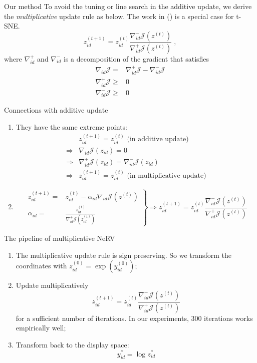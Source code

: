 \documentclass[first=dgreen,second=purple,logo=yellowexc]{aaltoslides}
\begin{document}
\begin{frame}{Our method}
To avoid the tuning or line search in the additive update, we derive the \emph{multiplicative} update rule as below. The work in (\cite{yang10mlsp}) is a special case for t-SNE.
\[
z^{(t+1)}_{id}=z^{(t)}_{id}\frac{\nabla^-_{id} \mathcal{J}(z^{(t)})}{\nabla^+_{id} \mathcal{J}(z^{(t)})}\;,
\]
where $\nabla_{id}^+$ and $\nabla_{id}^-$ is a decomposition of the gradient that satisfies
\begin{align*}
\nabla_{id}\mathcal{J} =& \nabla_{id}^+\mathcal{J}-\nabla_{id}^-\mathcal{J}\\
\nabla_{id}^+\mathcal{J} \ge& 0\\
\nabla_{id}^-\mathcal{J} \ge& 0
\end{align*}
\end{frame}

\begin{frame}{Connections with additive update}
\begin{enumerate}
\item They have the same extreme points:
\begin{align*}
& z_{id}^{(t+1)}=z_{id}^{(t)} \mbox{ (in additive update)}\\
\Longrightarrow& \nabla_{id}\mathcal{J}(z_{id})=0\\
\Longrightarrow& \nabla_{id}^+\mathcal{J}(z_{id})=\nabla_{id}^-\mathcal{J}(z_{id})\\
\Longrightarrow& z_{id}^{(t+1)}=z_{id}^{(t)}\mbox{ (in multiplicative update)}
\end{align*}
\item
\[
\left.
\begin{aligned}
z^{(t+1)}_{id} =& z^{(t)}_{id}-\alpha_{id} \nabla_{id} \mathcal{J}(z^{(t)})\\
\alpha_{id} =& \frac{z_{id}^{(t)}}{\nabla_{id}^+\mathcal{J}(z_{id}^{(t)})}
\end{aligned}
\right\}\Longrightarrow z^{(t+1)}_{id}=z^{(t)}_{id}\frac{\nabla^-_{id} \mathcal{J}(z^{(t)})}{\nabla^+_{id} \mathcal{J}(z^{(t)})}
\]
\end{enumerate}
\end{frame}


\begin{frame}{The pipeline of multiplicative NeRV}
\begin{enumerate}
\item The multiplicative update rule is sign preserving. So we transform the coordinates with $z_{id}^{(0)}=\exp(y_{id}^{(0)})$;
\item Update multiplicatively
\[
z^{(t+1)}_{id}=z^{(t)}_{id}\frac{\nabla^-_{id} \mathcal{J}(z^{(t)})}{\nabla^+_{id} \mathcal{J}(z^{(t)})}
\]
for a sufficient number of iterations. In our experiments, 300 iterations works empirically well;
\item Transform back to the display space:
\[
y_{id}^* =\log z^{*}_{id}
\]
\end{enumerate}
\end{frame}
\end{document}
